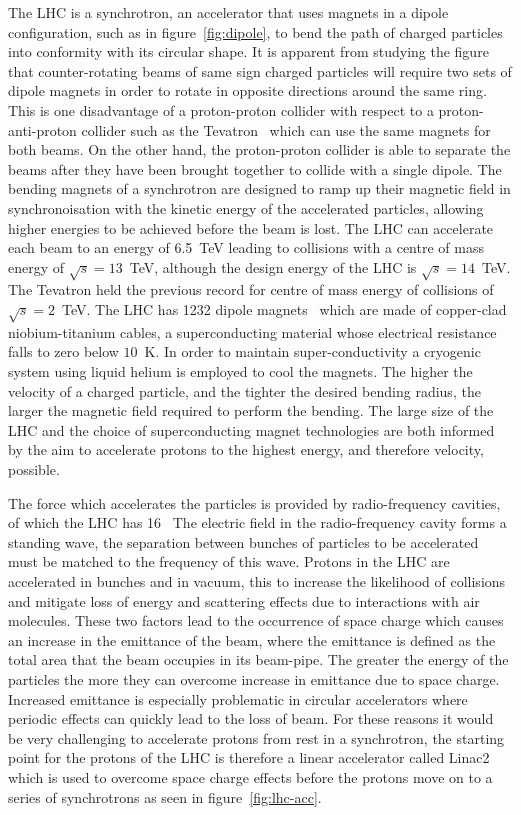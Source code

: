 The LHC is a synchrotron, an accelerator that uses magnets in a dipole
configuration, such as in figure~\ref{fig:dipole}, to bend the path of charged
particles into conformity with its circular shape. It is apparent from studying
the figure that counter-rotating beams of same sign charged particles will
require two sets of dipole magnets in order to rotate in opposite directions
around the same ring. This is one disadvantage of a proton-proton collider with
respect to a proton-anti-proton collider such as the Tevatron~\cite{tevatron-01}
which can use the same magnets for both beams. On the other hand, the
proton-proton collider is able to separate the beams after they have been
brought together to collide with a single dipole. The bending magnets of a
synchrotron are designed to ramp up their magnetic field in synchronoisation
with the kinetic energy of the accelerated particles, allowing higher energies
to be achieved before the beam is lost. The LHC can accelerate each beam to an
energy of 6.5~TeV leading to collisions with a centre of mass energy of
$\sqrt{s} = 13 $~TeV, although the design energy of the LHC is $\sqrt{s} = 14
$~TeV. The Tevatron held the previous record for centre of mass energy of
collisions of $\sqrt{s} = 2 $~TeV. The LHC has 1232 dipole magnets~\cite{LHC-dr}
which are made of copper-clad niobium-titanium cables, a superconducting
material whose electrical resistance falls to zero below $10$~K. In order to
maintain super-conductivity a cryogenic system using liquid helium is employed
to cool the magnets. The higher the velocity of a charged particle, and the
tighter the desired bending radius, the larger the magnetic field required to
perform the bending. The large size of the LHC and the choice of superconducting
magnet technologies are both informed by the aim to accelerate protons to the
highest energy, and therefore velocity, possible.


The force which accelerates the particles is provided by radio-frequency
cavities, of which the LHC has 16~\cite{LHC-dr} The electric field in the
radio-frequency cavity forms a standing wave, the separation between bunches of
particles to be accelerated must be matched to the frequency of this wave.
Protons in the LHC are accelerated in bunches and in vacuum, this to increase
the likelihood of collisions and mitigate loss of energy and scattering effects
due to interactions with air molecules. These two factors lead to the occurrence
of space charge which causes an increase in the emittance of the beam, where the
emittance is defined as the total area that the beam occupies in its beam-pipe.
The greater the energy of the particles the more they can overcome increase in
emittance due to space charge. Increased emittance is especially problematic in
circular accelerators where periodic effects can quickly lead to the loss of
beam. For these reasons it would be very challenging to accelerate protons from
rest in a synchrotron, the starting point for the protons of the LHC is
therefore a linear accelerator called Linac2 which is used to overcome space
charge effects before the protons move on to a series of synchrotrons as seen in
figure~\ref{fig:lhc-acc}.

